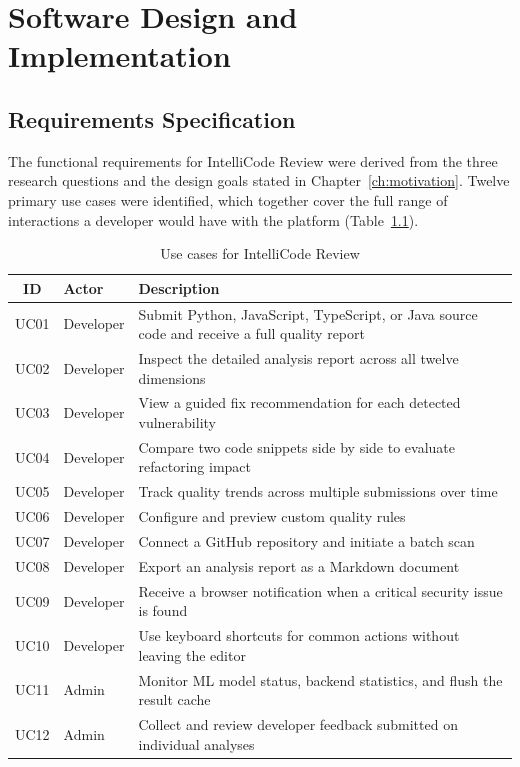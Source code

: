 \documentclass[12pt, oneside]{report}
\begin{document}
\chapter{Software Design and Implementation}
\label{ch:design}

\section{Requirements Specification}
\label{sec:requirements}

The functional requirements for IntelliCode Review were derived from the three
research questions and the design goals stated in Chapter~\ref{ch:motivation}. Twelve
primary use cases were identified, which together cover the full range of interactions a
developer would have with the platform (Table~\ref{tab:usecases}).

\begin{table}[H]
\centering
\caption{Use cases for IntelliCode Review}
\label{tab:usecases}
\begin{tabular}{@{}clp{8.5cm}@{}}
\toprule
\textbf{ID} & \textbf{Actor} & \textbf{Description} \\
\midrule
UC01 & Developer & Submit Python, JavaScript, TypeScript, or Java source code and receive a full quality report \\
UC02 & Developer & Inspect the detailed analysis report across all twelve dimensions \\
UC03 & Developer & View a guided fix recommendation for each detected vulnerability \\
UC04 & Developer & Compare two code snippets side by side to evaluate refactoring impact \\
UC05 & Developer & Track quality trends across multiple submissions over time \\
UC06 & Developer & Configure and preview custom quality rules \\
UC07 & Developer & Connect a GitHub repository and initiate a batch scan \\
UC08 & Developer & Export an analysis report as a Markdown document \\
UC09 & Developer & Receive a browser notification when a critical security issue is found \\
UC10 & Developer & Use keyboard shortcuts for common actions without leaving the editor \\
UC11 & Admin & Monitor ML model status, backend statistics, and flush the result cache \\
UC12 & Admin & Collect and review developer feedback submitted on individual analyses \\
\bottomrule
\end{tabular}
\end{table}
\end{document}
